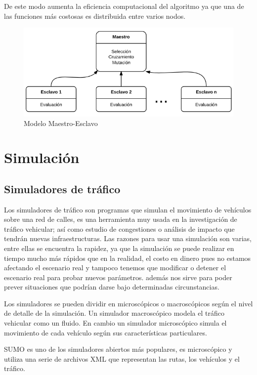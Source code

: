 De este modo aumenta la eficiencia computacional del algoritmo ya que una de las funciones más costosas es distribuida entre varios nodos.

\begin{figure}[H]
	\centering
	\includegraphics[width=0.7\linewidth]{Figures/diagrama-master-slave}
	\caption[Modelo Maestro-Esclavo]{Modelo Maestro-Esclavo}
	\label{fig:diagrama-master-slave}
\end{figure}



\section{Simulación}

\subsection{Simuladores de tráfico}
Los simuladores de tráfico son programas que simulan el movimiento de vehículos sobre una red de calles, es una herramienta muy usada en la investigación de tráfico vehicular; así como estudio de congestiones o análisis de impacto que tendrán nuevas infraestructuras.  Las razones para usar una simulación son varias, entre ellas se encuentra  la rapidez, ya que la simulación se puede realizar en tiempo mucho más rápidos que en la realidad, el costo en dinero pues no estamos afectando el escenario real  y tampoco tenemos que modificar o detener el escenario real para probar nuevos parámetros. además nos sirve para poder prever situaciones que podrían darse bajo determinadas circunstancias.

Los simuladores se pueden dividir en microscópicos o macroscópicos según el nivel de detalle de la simulación. Un simulador macroscópico modela  el tráfico vehicular como un fluido. En cambio un simulador microscópico simula el movimiento de cada vehículo según sus características particulares.

SUMO\citep{SUMO} es uno de los simuladores abiertos más populares, es microscópico y utiliza una serie de archivos  XML que representan las rutas, los vehículos y el tráfico.  

